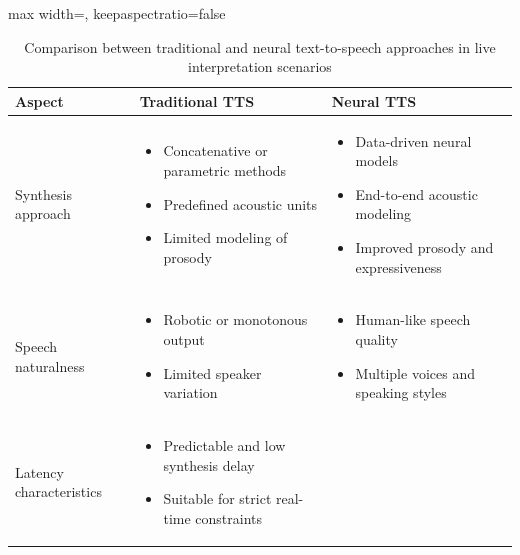 \begin{table}[!htbp]
  \centering
  \caption[Traditional and neural TTS comparison]{Comparison between traditional and neural text-to-speech approaches in live interpretation scenarios}
  \label{tab:tts_traditional_vs_neural}
  \begin{adjustbox}{max width=\textwidth, keepaspectratio=false}
    \begin{tabular}{p{4.3cm} p{7.5cm} p{7.5cm}}
      \toprule
      \textbf{Aspect} & \textbf{Traditional TTS} & \textbf{Neural TTS} \\
      \midrule
      Synthesis approach
      &
      \begin{itemize}[nosep,leftmargin=*]
        \item Concatenative or parametric methods
        \item Predefined acoustic units
        \item Limited modeling of prosody
      \end{itemize}
      &
      \begin{itemize}[nosep,leftmargin=*]
        \item Data-driven neural models
        \item End-to-end acoustic modeling
        \item Improved prosody and expressiveness
      \end{itemize} \\
      \midrule
      Speech naturalness
      &
      \begin{itemize}[nosep,leftmargin=*]
        \item Robotic or monotonous output
        \item Limited speaker variation
      \end{itemize}
      &
      \begin{itemize}[nosep,leftmargin=*]
        \item Human-like speech quality
        \item Multiple voices and speaking styles
      \end{itemize} \\
      \midrule
      Latency characteristics
      &
      \begin{itemize}[nosep,leftmargin=*]
        \item Predictable and low synthesis delay
        \item Suitable for strict real-time constraints
      \end{itemize}
      &
      \begin{itemize}[nosep,leftmargin=*]

\end{itemize}
\end{tabular}
\end{adjustbox}
\end{table}
